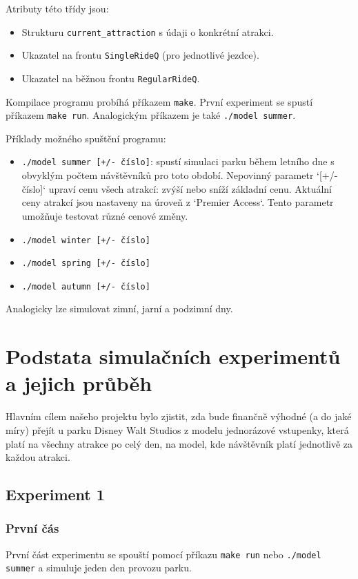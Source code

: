 \documentclass[a4paper,12pt]{article}
\begin{document}
Atributy této třídy jsou: 

\begin{itemize}
    \item Strukturu \texttt{current\_attraction} s údaji o konkrétní atrakci.  
    \item Ukazatel na frontu \texttt{SingleRideQ} (pro jednotlivé jezdce).  
    \item Ukazatel na běžnou frontu \texttt{RegularRideQ}.  
\end{itemize} 


Kompilace programu probíhá příkazem \texttt{make}.  
První experiment se spustí příkazem \texttt{make run}.  
Analogickým příkazem je také \texttt{./model summer}.  

Příklady možného spuštění programu:  
\begin{itemize}
    \item \texttt{./model summer [+/- číslo]}: spustí simulaci parku během letního dne s obvyklým počtem návštěvníků pro toto období. Nepovinný parametr `[+/- číslo]` upraví cenu všech atrakcí: zvýší nebo sníží základní cenu. Aktuální ceny atrakcí jsou nastaveny na úroveň z `Premier Access`. Tento parametr umožňuje testovat různé cenové změny.
    \item \texttt{./model winter [+/- číslo]} 
    \item \texttt{./model spring [+/- číslo]}
    \item \texttt{./model autumn [+/- číslo]}
\end{itemize} 
Analogicky lze simulovat zimní, jarní a podzimní dny.  



\section{Podstata simulačních experimentů a jejich průběh}

Hlavním cílem našeho projektu bylo zjistit, zda bude finančně výhodné (a do jaké míry) přejít u parku Disney Walt Studios z modelu jednorázové vstupenky, která platí na všechny atrakce po celý den, na model, kde návštěvník platí jednotlivě za každou atrakci.

\subsection{Experiment 1}

\subsubsection{První čás}
První část experimentu se spouští pomocí příkazu \texttt{make run} nebo \texttt{./model summer} a simuluje jeden den provozu parku.
\end{document}
